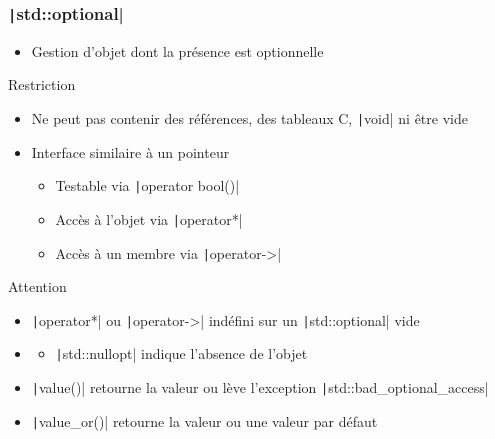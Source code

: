 \documentclass[C++.tex]{subfiles}
\begin{document}
\begin{frame}[fragile]
	\frametitle{\texttt|std::optional|}
	\begin{itemize}
		\item Gestion d'objet dont la présence est optionnelle
	\end{itemize}

	\begin{alertblock}{Restriction}
		\begin{itemize}
			\item Ne peut pas contenir des références, des tableaux C, \texttt|void| ni être vide
		\end{itemize}
	\end{alertblock}

	\begin{itemize}
		\item Interface similaire à un pointeur
		\begin{itemize}
			\item Testable via \texttt|operator bool()|
			\item Accès à l'objet via \texttt|operator*|
			\item Accès à un membre via \texttt|operator->|
		\end{itemize}
	\end{itemize}

	\begin{alertblock}{Attention}
		\begin{itemize}
			\item \texttt|operator*| ou \texttt|operator->| indéfini sur un \texttt|std::optional| vide
		\end{itemize}
	\end{alertblock}

	\begin{itemize}
		\item [] \begin{itemize}
			\item \texttt|std::nullopt| indique l'absence de l'objet
		\end{itemize}
		\item \texttt|value()| retourne la valeur ou lève l'exception \texttt|std::bad_optional_access|
		\item \texttt|value_or()| retourne la valeur ou une valeur par défaut
	\end{itemize}
\end{frame}
\end{document}
